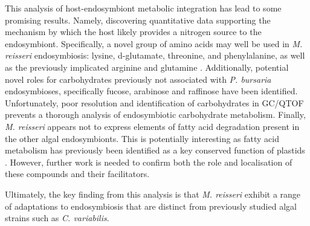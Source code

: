 This analysis of host-endosymbiont metabolic integration 
has lead to some promising results.
Namely, discovering quantitative data supporting the mechanism by which
the host likely provides a nitrogen source to the endosymbiont. 
Specifically, a novel group of amino acids may well be used in 
\textit{M. reisseri} endosymbiosis: lysine, d-glutamate, 
threonine, and phenylalanine, as well as the previously implicated
arginine and glutamine \citep{Kato2009a}.  Additionally,
potential novel roles for carbohydrates previously
not associated with \textit{P. bursaria} endosymbioses, specifically
fucose, arabinose and raffinose have been identified. 
Unfortunately, poor resolution and identification of carbohydrates 
in GC/QTOF prevents a thorough analysis of endosymbiotic carbohydrate
metabolism. 
Finally, \textit{M. reisseri} appears not to express elements of fatty
acid degradation present in the other algal endosymbionts. 
This is potentially interesting as fatty acid metabolism has previously
been identified as a key conserved function of plastids \citep{Donaher2009}.
However, further work is needed to confirm both the role and localisation of
these compounds and their facilitators.


Ultimately, the key finding from this analysis
is that \textit{M. reisseri} exhibit a range of adaptations
to endosymbiosis that are distinct from previously
studied algal strains such as \textit{C. variabilis}.


